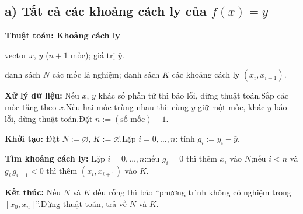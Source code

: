 \documentclass[11pt,a4paper]{article}
\newenvironment{thuattoan}[1]
  {\par\medskip\noindent\textbf{Thuật toán: #1}\begin{description}[style=standard,align=left,leftmargin=4.3em,labelwidth=3.9em,labelsep=0.4em,itemsep=1pt,topsep=3pt,font=\normalfont\bfseries]}
  {\end{description}}
\newcommand{\thut}{\newline\hspace*{1.2em}}
\begin{document}
\subsection{a) Tất cả các khoảng cách ly của $f(x)=\bar y$}
\begin{thuattoan}{Khoảng cách ly}
\item[Input:] vector $x$, $y$ ($n+1$ mốc); giá trị $\bar y$.
\item[Output:] danh sách $N$ các mốc là nghiệm; danh sách $K$ các khoảng cách ly $(x_i,x_{i+1})$.
\item[Bước 0:] \textbf{Xử lý dữ liệu:} Nếu $x$, $y$ khác số phần tử thì báo lỗi, dừng thuật toán.\newline Sắp các mốc tăng theo $x$.\newline Nếu hai mốc trùng nhau thì: cùng $y$ giữ một mốc, khác $y$ báo lỗi, dừng thuật toán.\newline Đặt $n:=(\text{số mốc})-1$.
\item[Bước 1:] \textbf{Khởi tạo:} Đặt $N:=\varnothing$, $K:=\varnothing$.\newline Lặp $i=0,\dots,n$: tính $g_i:=y_i-\bar y$.
\item[Bước 2:] \textbf{Tìm khoảng cách ly:} Lặp $i=0,\dots,n$:\thut nếu $g_i=0$ thì thêm $x_i$ vào $N$;\thut nếu $i<n$ và $g_i\,g_{i+1}<0$ thì thêm $(x_i,x_{i+1})$ vào $K$.
\item[Bước 3:] \textbf{Kết thúc:} Nếu $N$ và $K$ đều rỗng thì báo ``phương trình không có nghiệm trong $[x_0,x_n]$''.\newline Dừng thuật toán, trả về $N$ và $K$.
\end{thuattoan}
\end{document}
